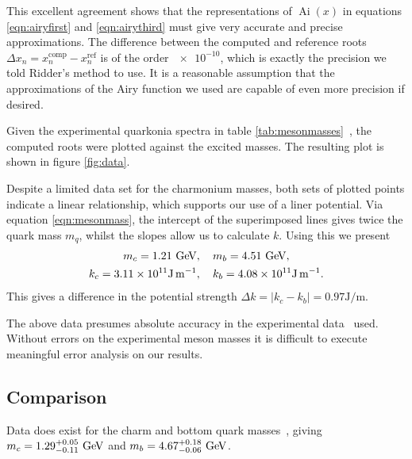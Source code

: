 \documentclass[]{article}
\renewcommand{\mod}[1]{\ensuremath{\lvert {#1} \rvert}}
\newcommand{\Ai}[1]{\ensuremath{\operatorname{Ai}({#1})}}
\begin{document}
This excellent agreement shows that the representations of \Ai{x} in equations \ref{eqn:airyfirst} and \ref{eqn:airythird} must give very accurate and precise approximations. The difference between the computed and reference roots $\Delta x_{n} = x_{n}^{\mathrm{comp}} - x_{n}^{\mathrm{ref}}$ is of the order $\num{e-10}$, which is exactly the precision we told Ridder's method to use. It is a reasonable assumption that the approximations of the Airy function we used are capable of even more precision if desired.\footnotemark


Given the experimental quarkonia spectra in table \ref{tab:mesonmasses}~\cite{ref:gdaniell}, the computed roots were plotted against the excited masses. The resulting plot is shown in figure \ref{fig:data}.

Despite a limited data set for the charmonium masses, both sets of plotted points indicate a linear relationship, which supports our use of a liner potential. Via equation \ref{eqn:mesonmass}, the intercept of the superimposed lines gives twice the quark mass $m_{q}$, whilst the slopes allow us to calculate $k$. Using this we present
\begin{align*}
m_{c} = 1.21\GeV&,\quad m_{b} = 4.51\GeV,\\
k_{c} = \num{3.11e11}\si{\joule\per\metre}&,\quad k_{b} = \num{4.08e11}\si{\joule\per\metre}.
\end{align*}
This gives a difference in the potential strength $\Delta k = \mod{k_{c} - k_{b}} = 0.97\si{\joule\per\metre}$.

The above data presumes absolute accuracy in the experimental data~\cite{ref:gdaniell} used. Without errors on the experimental meson masses it is difficult to execute meaningful error analysis on our results.

\subsection{Comparison}

Data does exist for the charm and bottom quark masses~\cite{ref:pdg}, giving $m_{c} = 1.29^{+0.05}_{-0.11}\GeV$ and $m_{b} = 4.67^{+0.18}_{-0.06}\GeV$.\footnotemark
\end{document}
